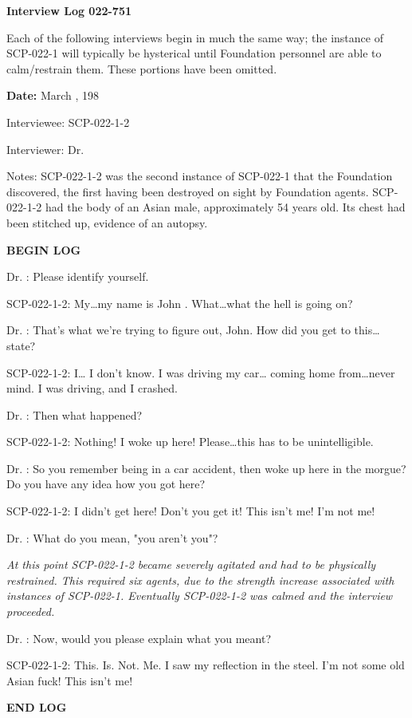 \textbf{Interview Log 022-751}

Each of the following interviews begin in much the same way; the instance of SCP-022-1 will typically be hysterical until Foundation personnel are able to calm/restrain them. These portions have been omitted.

\textbf{Date:} March , 198

Interviewee: SCP-022-1-2

Interviewer: Dr. 

Notes: SCP-022-1-2 was the second instance of SCP-022-1 that the Foundation discovered, the first having been destroyed on sight by Foundation agents. SCP-022-1-2 had the body of an Asian male, approximately 54 years old. Its chest had been stitched up, evidence of an autopsy.

\begin{boxedminipage}{\textwidth}
\begin{flushleft}
\textbf{\lb BEGIN LOG\rb}

Dr. : Please identify yourself.

SCP-022-1-2: My…my name is John . What…what the hell is going on?

Dr. : That's what we're trying to figure out, John. How did you get to this… state?

SCP-022-1-2: I… I don't know. I was driving my car… coming home from…never mind. I was driving, and I crashed.

Dr. : Then what happened?

SCP-022-1-2: Nothing! I woke up here! Please…this has to be \lb unintelligible\rb.

Dr. : So you remember being in a car accident, then woke up here in the morgue? Do you have any idea how you got here?

SCP-022-1-2: I didn't get here! Don't you get it! This isn't me! I'm not me!

Dr. : What do you mean, "you aren't you"?

\textsl{At this point SCP-022-1-2 became severely agitated and had to be physically restrained. This required six agents, due to the strength increase associated with instances of SCP-022-1. Eventually SCP-022-1-2 was calmed and the interview proceeded.}

Dr. : Now, would you please explain what you meant?

SCP-022-1-2: This. Is. Not. Me. I saw my reflection in the steel. I'm not some old Asian fuck! This isn't me!

\textbf{\lb END LOG\rb}
\end{flushleft}
\end{boxedminipage}

